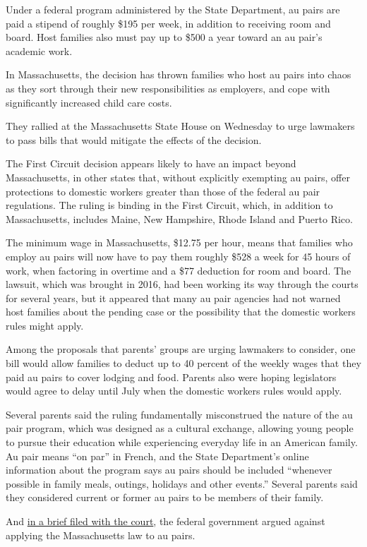 Under a federal program administered by the State Department, au pairs
are paid a stipend of roughly \$195 per week, in addition to receiving
room and board. Host families also must pay up to \$500 a year toward an
au pair's academic work.

In Massachusetts, the decision has thrown families who host au pairs
into chaos as they sort through their new responsibilities as employers,
and cope with significantly increased child care costs.

They rallied at the Massachusetts State House on Wednesday to urge
lawmakers to pass bills that would mitigate the effects of the decision.

The First Circuit decision appears likely to have an impact beyond
Massachusetts, in other states that, without explicitly exempting au
pairs, offer protections to domestic workers greater than those of the
federal au pair regulations. The ruling is binding in the First Circuit,
which, in addition to Massachusetts, includes Maine, New Hampshire,
Rhode Island and Puerto Rico.

The minimum wage in Massachusetts, \$12.75 per hour, means that families
who employ au pairs will now have to pay them roughly \$528 a week for
45 hours of work, when factoring in overtime and a \$77 deduction for
room and board. The lawsuit, which was brought in 2016, had been working
its way through the courts for several years, but it appeared that many
au pair agencies had not warned host families about the pending case or
the possibility that the domestic workers rules might apply.

Among the proposals that parents' groups are urging lawmakers to
consider, one bill would allow families to deduct up to 40 percent of
the weekly wages that they paid au pairs to cover lodging and food.
Parents also were hoping legislators would agree to delay until July
when the domestic workers rules would apply.

Several parents said the ruling fundamentally misconstrued the nature of
the au pair program, which was designed as a cultural exchange, allowing
young people to pursue their education while experiencing everyday life
in an American family. Au pair means ``on par'' in French, and the State
Department's online information about the program says au pairs should
be included ``whenever possible in family meals, outings, holidays and
other events.'' Several parents said they considered current or former
au pairs to be members of their family.

And
\href{https://www.state.gov/wp-content/uploads/2019/10/Brief-in-response-to-court\%E2\%80\%99s-request-in-Capron-v.-Massachusetts.pdf}{in
a brief filed with the court}, the federal government argued against
applying the Massachusetts law to au pairs.

